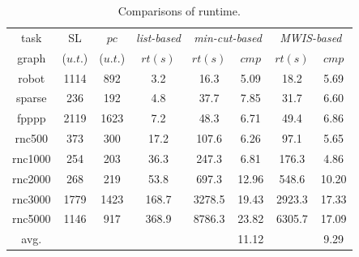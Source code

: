 \documentclass[10pt,journal]{IEEEtran}
\begin{document}
\begin{table}[!h]
\renewcommand{\arraystretch}{1.1}
\caption{Comparisons of runtime.}
\centering
\begin{tabular}{c|c|c|c|c|c|c|c}
\hline
\hline
task                             &SL           &$pc$        & \hspace*{-0.5em}\textit{list-based}\hspace*{-0.5em}        &\multicolumn{2}{c|}{\textit{min-cut-based}}   &\multicolumn{2}{c}{\textit{MWIS-based}}        \\  \cline{5-6} \cline{7-8}
graph                                                   &\hspace*{-1em}($u.t.$)\hspace*{-1em}         &($u.t.$)       &$rt(s)$       &$rt(s)$    &$cmp$   &$rt(s)$     &$cmp$    \\
\hline
\hline

robot              &1114      &892  &3.2     &16.3         &5.09 &18.2  &5.69     \\


sparse              &236       &192  &4.8  &37.7       &7.85   &31.7  &6.60   \\

fpppp           &2119  &1623  &7.2 &48.3   &6.71 &49.4    &6.86  \\

rnc500            &373    &300   &17.2  &107.6   &6.26  &97.1   &5.65  \\

rnc1000            &254  &203    &36.3 &247.3  &6.81   &176.3    &4.86   \\

rnc2000          &268    &219    &53.8  &697.3      &12.96   &548.6  &10.20   \\

rnc3000           &1779  &1423  &168.7  &\hspace*{-0.5em}3278.5\hspace*{-0.5em}  &19.43  &\hspace*{-0.5em}2923.3\hspace*{-0.5em}    &17.33  \\

rnc5000          &1146   &917  &368.9  &\hspace*{-0.5em}8786.3\hspace*{-0.5em}  &23.82  &\hspace*{-0.5em}6305.7\hspace*{-0.5em}   &17.09    \\

\hline

avg.          &    &  &   &   &11.12  &   &9.29       \\
\hline
\hline
\end{tabular}
\label{table:VPCTC}
\end{table}
\end{document}
